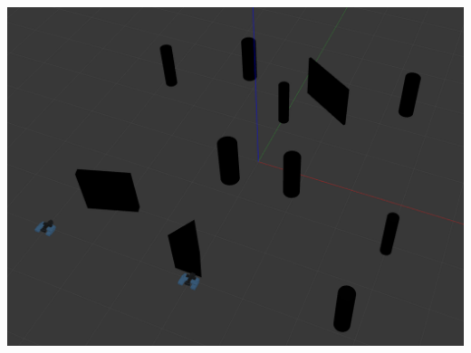 \documentclass[a0paper,portrait]{baposter}
\begin{document}
\begin{poster}
{			\begin{center}
				\includegraphics[width=\linewidth]{graphics/exemple_model.png}
			\end{center}

}
\end{poster}
\end{document}
